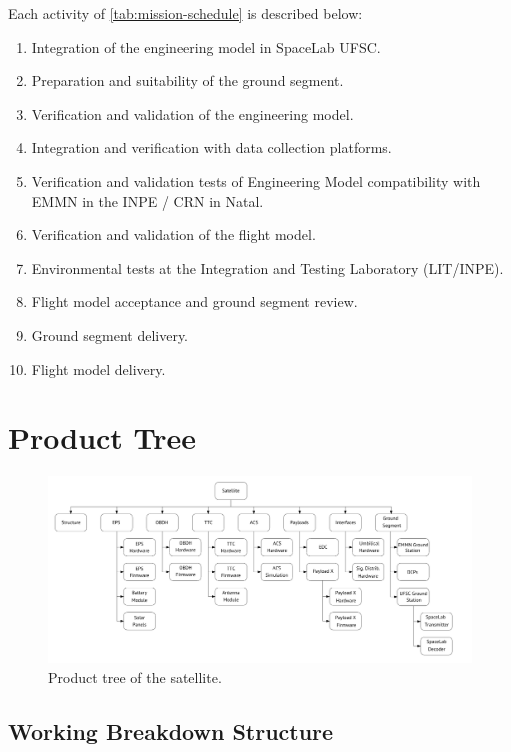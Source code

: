 Each activity of \autoref{tab:mission-schedule} is described below:

\begin{enumerate}
    \item Integration of the engineering model in SpaceLab UFSC.
    \item Preparation and suitability of the ground segment.
    \item Verification and validation of the engineering model.
    \item Integration and verification with data collection platforms.
    \item Verification and validation tests of Engineering Model compatibility with EMMN in the INPE / CRN in Natal.
    \item Verification and validation of the flight model.
    \item Environmental tests at the Integration and Testing Laboratory (LIT/INPE).
    \item Flight model acceptance and ground segment review.
    \item Ground segment delivery.
    \item Flight model delivery.
\end{enumerate}

\section{Product Tree}


\begin{figure}[!ht]
    \begin{center}
        \includegraphics[width=\textwidth]{figures/product-tree.pdf}
        \caption{Product tree of the satellite.}
        \label{fig:product-tree}
    \end{center}
\end{figure}

\subsection{Working Breakdown Structure}

